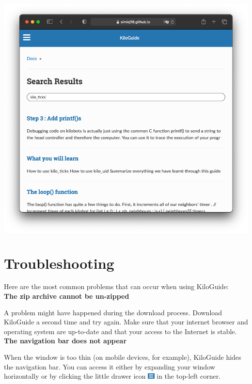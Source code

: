 \documentclass[a4paper,12pt,titlepage]{scrartcl}
\begin{document}
\begin{center}
\includegraphics[scale=0.3]{kilosearch.png}
\end{center}

\section{Troubleshooting}

Here are the most common problems that can occur when using KiloGuide:\\

\textbf{The zip archive cannot be un-zipped}

A problem might have happened during the download process. Download KiloGuide a second time and try again. Make sure that your internet browser and operating system are up-to-date and that your access to the Internet is stable.\\

\textbf{The navigation bar does not appear}

When the window is too thin (on mobile devices, for example), KiloGuide hides the navigation bar. You can access it either by expanding your window horizontally or by clicking the little drawer icon \includegraphics[height=11px]{drawer.png} in the top-left corner.\\
\end{document}
